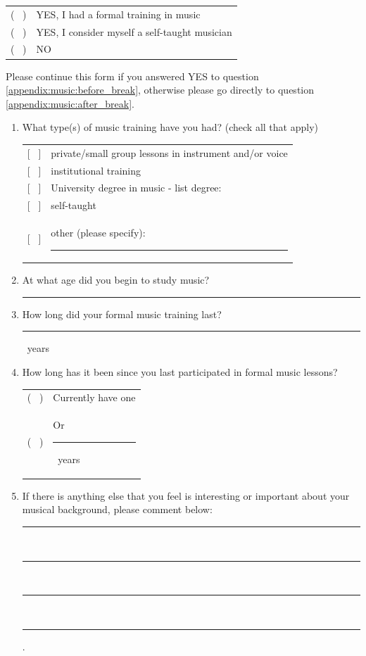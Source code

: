 \documentclass[a4paper,11pt]{article}
\newcommand{\myunderline}{\rule{2in}{.5pt}}
\begin{document}
{\begin{appendices}
\begin{enumerate}[resume]
	\begin{tabular}{l l}
		( \ ) & YES, I had a formal training in music \\
		( \ ) & YES, I consider myself a self-taught musician \\
		( \ ) & NO \\
	\end{tabular}

\end{enumerate}
Please continue this form if you answered YES to question \ref{appendix:music:before_break}, otherwise please go directly to question \ref{appendix:music:after_break}.
\begin{enumerate}[resume]

	\item What type(s) of music training have you had? (check all that apply)

	\begin{tabular}{l l}
		{[{ \ }]} & private/small group lessons in instrument and/or voice \\
		{[{ \ }]} & institutional training \\
		{[{ \ }]} & University degree in music - list degree: \\
		{[{ \ }]} & self-taught \\
		{[{ \ }]} & other (please specify): \myunderline \\
	\end{tabular}

 	\item At what age did you begin to study music?

 	\myunderline

 	\item How long did your formal music training last?

 	\myunderline \ years
 	\item How long has it been since you last participated in formal music lessons?

	\begin{tabular}{l l}
		( \ ) & Currently have one \\
		( \ ) & Or \myunderline \ years \\
	\end{tabular}

	\item \label{appendix:music:after_break}If there is anything else that you feel is interesting or important about your musical background, please comment below:

	\rule{4.5in}{.5pt} \\
	\rule{4.5in}{.5pt} \\
	\rule{4.5in}{.5pt} \\
	\rule{4.5in}{.5pt}.


\end{enumerate}
\end{appendices}}
\end{document}
